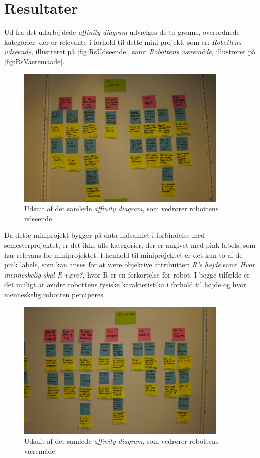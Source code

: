 \section*{Resultater}
\label{Resultater}
%
Ud fra det udarbejdede \textit{affinity diagram} udvælges de to grønne, overordnede kategorier, der er relevante i forhold til dette mini projekt, som er: \textit{Robottens udseende}, illustreret på \autoref{fig:RsUdseende}, samt \textit{Robottens væremåde}, illustreret på \autoref{fig:RsVaeremaade}.
%
\begin{figure}[H]
\centering
\includegraphics[width = 0.9\textwidth]{Figure/RsUdseende} 
\caption{Udsnit af det samlede \textit{affinity diagram}, som vedrører robottens udseende.}
\label{fig:RsUdseende}
\end{figure}
\noindent
%
Da dette miniprojekt bygger på data indsamlet i forbindelse med semesterprojektet, er det ikke alle kategorier, der er angivet med pink labels, som har relevans for miniprojektet. I henhold til miniprojektet er det kun to af de pink labels, som kan anses for at være objektive attributter: \textit{R's højde} samt \textit{Hvor menneskelig skal R være?}, hvor R er en forkortelse for robot. I begge tilfælde er det muligt at ændre robottens fysiske karakteristika i forhold til højde og hvor menneskelig robotten perciperes. 
%
\begin{figure}[H]
\centering
\includegraphics[width = 0.9\textwidth]{Figure/RsVaeremaade} 
\caption{Udsnit af det samlede \textit{affinity diagram}, som vedrører robottens væremåde.}
\label{fig:RsVaeremaade}
\end{figure}
